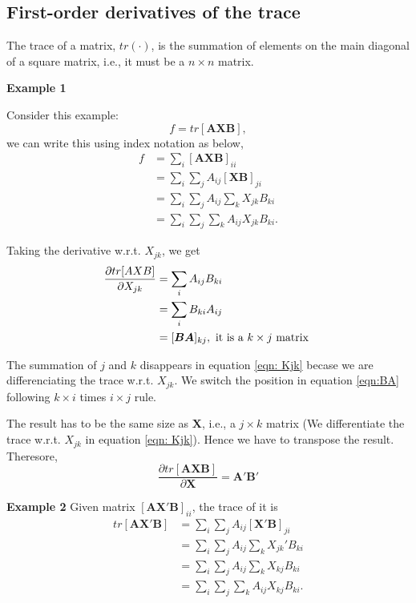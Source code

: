 \documentclass[10pt]{article}
\begin{document}
\subsection{First-order derivatives of the trace}
The trace of a matrix, $ tr(\cdot ) $, is the summation
of elements on the main diagonal of a square matrix,
i.e., it must be a $ n  \times  n $ matrix.


{\textbf {Example 1}}

Consider this example:
\begin{equation}
		f = tr[\bm{AXB}],
\end{equation}
we can write this using index notation as below,
\begin{align*}
		f &= \sum\limits_{i} [\bm{AXB}]_{ii} \\
			&= \sum\limits_{i} \sum\limits_{j} A_{ij}[\bm{XB}]
			_{ji}\\
			&= \sum\limits_{i} \sum\limits_{j} A_{ij}
			\sum\limits_{k} X_{jk}B_{ki}\\
			&= \sum\limits_{i} \sum\limits_{j} \sum\limits_{k}
			A_{ij}X_{jk}B_{ki}.
\end{align*}


Taking the derivative w.r.t. $ X_{jk} $, we get
\begin{align}
		\frac{\partial tr[AXB] }{\partial X_{jk} } &= 
\sum\limits_{i} A_{ij}B_{ki} \label{eqn: Kjk}\\
&= \sum\limits_{i} B_{ki}A_{ij} \label{eqn:BA}\\
&= [\bm{BA}]_{kj}, \text{ it is a $ k  \times j $ matrix }
\end{align}

The summation of $ j $ and $ k $ disappears in equation \eqref{eqn: Kjk} becase
we are differenciating the trace w.r.t. $ X_{jk} $. We switch the position in 
equation \eqref{eqn:BA} following $ k  \times  i $ times $ i  \times j $ rule.





The result has to be the same size as $ \bm{X} $, 
i.e., a $ j  \times  k $ matrix (We differentiate the
trace w.r.t. $ X_{jk} $ in equation \eqref{eqn: Kjk}). Hence we have to transpose the result. Theresore,
\begin{equation}
		\frac{\partial tr[\bm{AXB}] }{\partial \bm{X} }
		=\bm{A}'\bm{B}' \label{eqn:axb}
\end{equation}



{\textbf {Example 2}}
Given  matrix $ [\bm{AX}'\bm{B}]_{ii} $, the trace of it is
\begin{align*}
		tr[\bm{AX}'\bm{B}] &= \sum\limits_{i}\sum\limits_{j}
		A_{ij}[\bm{X'}\bm{B}]_{ji}\\
		&= \sum\limits_{i}\sum\limits_{j}A_{ij}
		\sum\limits_{k} X_{jk}'B_{ki}\\
		&= \sum\limits_{i}\sum\limits_{j}A_{ij}
		\sum\limits_{k} X_{kj}B_{ki}\\
		&= \sum\limits_{i}\sum\limits_{j}\sum\limits_{k}A_{ij}
		 X_{kj}B_{ki}.
\end{align*}
\end{document}
